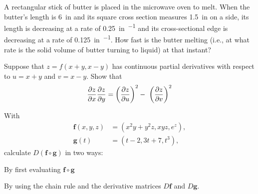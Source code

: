 \documentclass[boxes]{gsypset}
\begin{document}
	\begin{problem}[2.5.6]
		A rectangular stick of butter is placed in the microwave oven to melt. 
		When the butter's length is \SI{6}{in} and 
		its square cross section measures \SI{1.5}{in} on a side, 
		its length is decreasing at a rate of \SI{0.25}{in\per\min} and 
		its cross-sectional edge is decreasing at a rate of \SI{0.125}{in\per\min}. 
		How fast is the butter melting 
		(i.e., at what rate is the solid volume of butter turning to liquid) 
		at that instant?
	\end{problem}
	\begin{solution}
		
	\end{solution}
	
	\begin{problem}[2.5.14]
		Suppose that $z = f (x + y, x - y)$ has continuous partial derivatives with respect to 
		$u = x + y$ and $v = x - y$.
		Show that
		\[
			\frac{\partial^{\kern -.5pt} z}{\partial x^{\kern -.5pt}} \frac{\partial^{\kern -.5pt} z}{\partial y^{\kern -.5pt}} = \left(\frac{\partial^{\kern -.5pt} z}{\partial u^{\kern -.5pt}}\right)^2 -\ \left(\frac{\partial^{\kern -.5pt} z}{\partial v^{\kern -.5pt}}\right)^2
		\]
	\end{problem}
	\begin{solution}
		
	\end{solution}
	
	\begin{problem}[2.5.24]
		With
		\begin{align*}
			\mathbf{f}(x,y,z) &= (x^2y + y^2z, xyz, e^z), \\
			\mathbf{g}(t) &= (t-2, 3t+7, t^3),
		\end{align*}
		calculate $D(\mathbf{f} \circ \mathbf{g})$ in two ways:
		\begin{subproblems}
			\subproblem By first evaluating $\mathbf{f} \circ \mathbf{g}$
				\begin{solution}
					
				\end{solution}
				
			\subproblem By using the chain rule and the derivative matrices 
				$D\mathbf{f}$ and $D\mathbf{g}$.
				\begin{solution}
					
				\end{solution}
		\end{subproblems}
	\end{problem}
	
\end{document}
